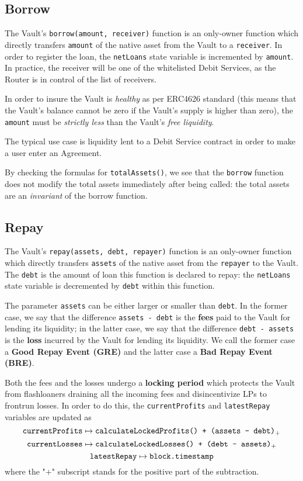 \documentclass[a4paper,10 pt]{article}
\theoremstyle{definition}
\begin{document}
\subsection{Borrow}\label{borrowSub}

The Vault's \verb|borrow(amount, receiver)| function is an only-owner function which directly transfers \verb|amount| of the native asset from the Vault to a \verb|receiver|. In order to register the loan, the \verb|netLoans| state variable is incremented by \verb|amount|. In practice, the receiver will be one of the whitelisted Debit Services, as the Router is in control of the list of receivers.

In order to insure the Vault is {\it healthy} as per ERC4626 standard (this means that the Vault's balance cannot be zero if the Vault's supply is higher than zero),  the \verb|amount| must be {\it strictly less} than the Vault's {\it free liquidity}.

The typical use case is liquidity lent to a Debit Service contract in order to make a user enter an Agreement.

By checking the formulas for \verb|totalAssets()|, we see that the \verb|borrow| function does not modify the total assets immediately after being called: the total assets are an {\it invariant} of the borrow function.
\subsection{Repay}\label{repaySub}

The Vault's \verb|repay(assets, debt, repayer)| function is an only-owner function which directly transfers \verb|assets| of the native asset from the \verb|repayer| to the Vault. The \verb|debt| is the amount of loan this function is declared to repay: the \verb|netLoans| state variable is decremented by \verb|debt| within this function.

The parameter \verb|assets| can be either larger or smaller than \verb|debt|. In the former case, we say that the difference \verb|assets - debt| is the {\bf fees} paid to the Vault for lending its liquidity; in the latter case, we say that the difference \verb|debt - assets| is the {\bf loss} incurred by the Vault for lending its liquidity. We call the former case a {\bf Good Repay Event (GRE)} and the latter case a {\bf Bad Repay Event (BRE)}. 

Both the fees and the losses undergo a {\bf locking period} which protects the Vault from flashloaners draining all the incoming fees and disincentivize LPs to frontrun losses. In order to do this, the \verb|currentProfits| and \verb|latestRepay| variables are updated as 
$$\verb|currentProfits| \mapsto \verb|calculateLockedProfits() + (assets - debt)|_+$$ 
$$\verb|currentLosses| \mapsto \verb|calculateLockedLosses() + (debt - assets)|_+$$ 
$$\verb|latestRepay| \mapsto \verb|block.timestamp|$$ 
where the "$+$" subscript stands for the positive part of the subtraction.
\end{document}
